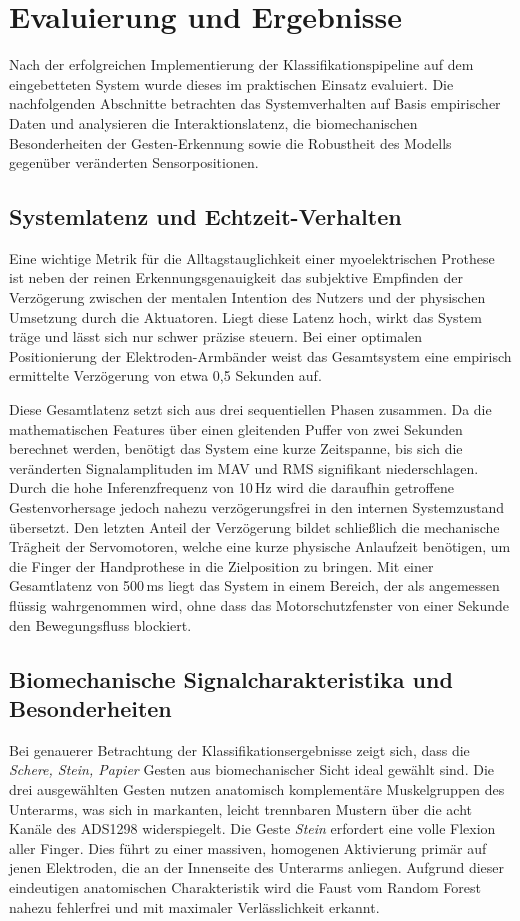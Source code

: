 \section{Evaluierung und Ergebnisse}
\label{sec:evaluierung}
Nach der erfolgreichen Implementierung der Klassifikationspipeline auf dem eingebetteten System wurde dieses im praktischen Einsatz evaluiert. Die nachfolgenden Abschnitte betrachten das Systemverhalten auf Basis empirischer Daten und analysieren die Interaktionslatenz, die biomechanischen Besonderheiten der Gesten-Erkennung sowie die Robustheit des Modells gegenüber veränderten Sensorpositionen.

    \subsection{Systemlatenz und Echtzeit-Verhalten}
    Eine wichtige Metrik für die Alltagstauglichkeit einer myoelektrischen Prothese ist neben der reinen Erkennungsgenauigkeit das subjektive Empfinden der Verzögerung zwischen der mentalen Intention des Nutzers und der physischen Umsetzung durch die Aktuatoren. Liegt diese Latenz hoch, wirkt das System träge und lässt sich nur schwer präzise steuern. Bei einer optimalen Positionierung der Elektroden-Armbänder weist das Gesamtsystem eine empirisch ermittelte Verzögerung von etwa 0,5 Sekunden auf.

    Diese Gesamtlatenz setzt sich aus drei sequentiellen Phasen zusammen. Da die mathematischen Features über einen gleitenden Puffer von zwei Sekunden berechnet werden, benötigt das System eine kurze Zeitspanne, bis sich die veränderten Signalamplituden im \acf{MAV} und \acf{RMS} signifikant niederschlagen. Durch die hohe Inferenzfrequenz von 10\,Hz wird die daraufhin getroffene Gestenvorhersage jedoch nahezu verzögerungsfrei in den internen Systemzustand übersetzt. Den letzten Anteil der Verzögerung bildet schließlich die mechanische Trägheit der Servomotoren, welche eine kurze physische Anlaufzeit benötigen, um die Finger der Handprothese in die Zielposition zu bringen. Mit einer Gesamtlatenz von 500\,ms liegt das System in einem Bereich, der als angemessen flüssig wahrgenommen wird, ohne dass das Motorschutzfenster von einer Sekunde den Bewegungsfluss blockiert.

    \subsection{Biomechanische Signalcharakteristika und Besonderheiten}
    Bei genauerer Betrachtung der Klassifikationsergebnisse zeigt sich, dass die \textit{Schere, Stein, Papier} Gesten aus biomechanischer Sicht ideal gewählt sind. Die drei ausgewählten Gesten nutzen anatomisch komplementäre Muskelgruppen des Unterarms, was sich in markanten, leicht trennbaren Mustern über die acht Kanäle des \textsf{ADS1298} widerspiegelt. Die Geste \textit{Stein} erfordert eine volle Flexion aller Finger. Dies führt zu einer massiven, homogenen Aktivierung primär auf jenen Elektroden, die an der Innenseite des Unterarms anliegen. Aufgrund dieser eindeutigen anatomischen Charakteristik wird die Faust vom Random Forest nahezu fehlerfrei und mit maximaler Verlässlichkeit erkannt.

